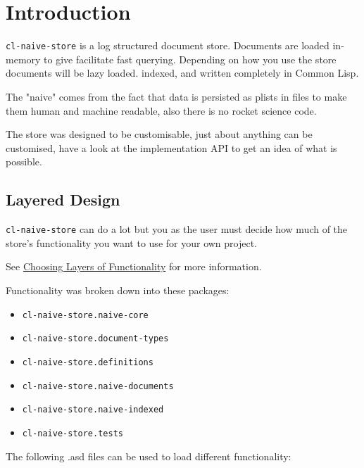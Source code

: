 \documentclass[11pt]{article}
\author{Phil}
\date{\today}
\title{}
\begin{document}
\tableofcontents

\section{Introduction}
\label{sec:org787b926}

\texttt{cl-naive-store} is a log structured document store. Documents are
loaded in-memory to give facilitate fast querying. Depending on how
you use the store documents will be lazy loaded. indexed, and written
completely in Common Lisp.

The "naive" comes from the fact that data is persisted
as plists in files to make them human and machine readable, also there
is no rocket science code.

The store was designed to be customisable, just about anything can be
customised, have a look at the implementation API to get an idea of
what is possible.

\subsection{Layered Design}
\label{sec:org208e047}

\texttt{cl-naive-store} can do a lot but you as the user must decide how much
of the store's functionality you want to use for your own project.

See \href{overview.org}{Choosing Layers of Functionality} for more information.

Functionality was broken down into these packages:

\begin{itemize}
\item \texttt{cl-naive-store.naive-core}
\item \texttt{cl-naive-store.document-types}
\item \texttt{cl-naive-store.definitions}
\item \texttt{cl-naive-store.naive-documents}
\item \texttt{cl-naive-store.naive-indexed}
\item \texttt{cl-naive-store.tests}
\end{itemize}

The following .asd files can be used to load different functionality:
\end{document}
